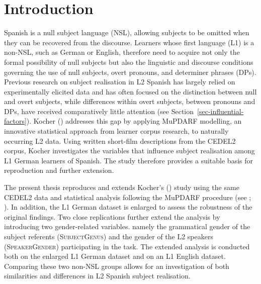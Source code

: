\documentclass[
  letterpaper,
  DIV=11,
  numbers=noendperiod]{scrartcl}
\begin{document}
\listoffigures

\newpage{}

\listoftables

\newpage{}


\section{Introduction}\label{sec-introduction}

Spanish is a null subject language (NSL), allowing subjects to be
omitted when they can be recovered from the discourse. Learners whose
first language (L1) is a non-NSL, such as German or English, therefore
need to acquire not only the formal possibility of null subjects but
also the linguistic and discourse conditions governing the use of null
subjects, overt pronouns, and determiner phrases (DPs). Previous
research on subject realisation in L2 Spanish has largely relied on
experimentally elicited data and has often focused on the distinction
between null and overt subjects, while differences within overt
subjects, between pronouns and DPs, have received comparatively little
attention (see Section~\ref{sec-influential-factors}). Kocher
() addresses this gap by
applying MuPDARF modelling, an innovative statistical approach from
learner corpus research, to naturally occurring L2 data. Using written
short-film descriptions from the CEDEL2 corpus, Kocher investigates the
variables that influence subject realisation among L1 German learners of
Spanish. The study therefore provides a suitable basis for reproduction
and further extension.

The present thesis reproduces and extends Kocher's
() study using the same CEDEL2
data and statistical analysis following the MuPDARF procedure (see
;
). In addition, the L1
German dataset is enlarged to assess the robustness of the original
findings. Two close replications further extend the analysis by
introducing two gender-related variables. namely the grammatical gender
of the subject referents (\textsc{SubjectGenus}) and the gender of the
L2 speakers (\textsc{SpeakerGender}) participating in the task. The
extended analysis is conducted both on the enlarged L1 German dataset
and on an L1 English dataset. Comparing these two non-NSL groups allows
for an investigation of both similarities and differences in L2 Spanish
subject realisation.
\end{document}
